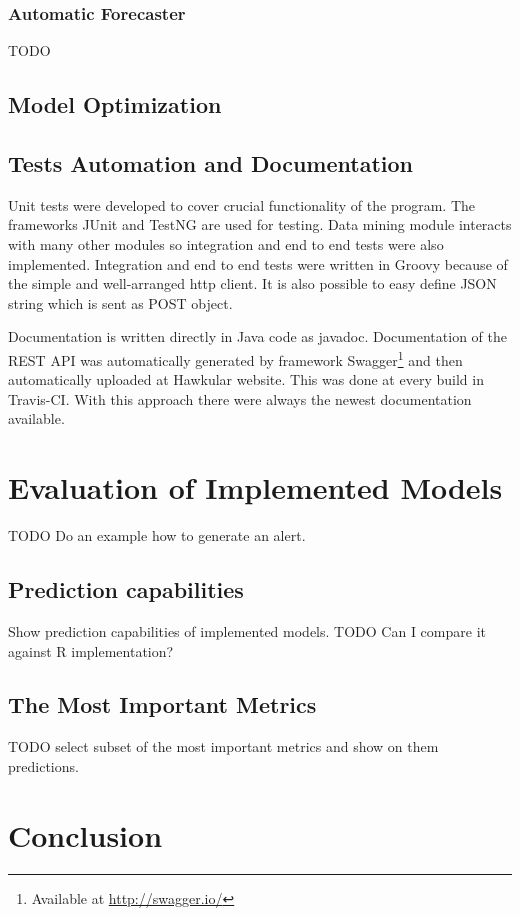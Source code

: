     \subsection{Automatic Forecaster}
        TODO

        \section{Model Optimization}

    \section{Tests Automation and Documentation}
    Unit tests were developed to cover crucial functionality of the program. The
    frameworks JUnit and TestNG are used for testing. Data mining module interacts with many other modules so
    integration and end to end tests were also implemented. Integration and end to end
    tests were written in Groovy because of the simple and well-arranged http client. It
    is also possible to easy define JSON string which is sent as POST object.

    Documentation is written directly in Java code as javadoc. Documentation of the REST
    API was automatically generated by framework Swagger\footnote{Available at
    \url{http://swagger.io/}} and then automatically uploaded at Hawkular website. This
    was done at every build in Travis-CI. With this approach there were always the newest 
    documentation available.

\chapter{Evaluation of Implemented Models}
TODO Do an example how to generate an alert.

    \section{Prediction capabilities}
    Show prediction capabilities of implemented models.
    TODO Can I compare it against R implementation?

    \section{The Most Important Metrics}
    TODO select subset of the most important metrics and show on them predictions.

\chapter{Conclusion}

